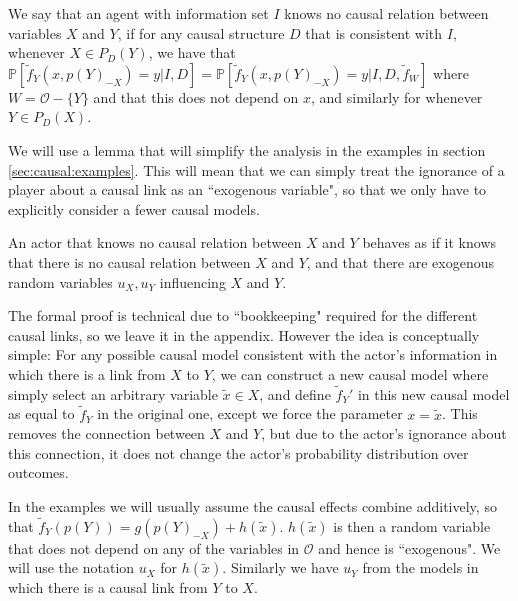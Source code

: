 \begin{definition} 
	We say that an agent with information set $I$ knows no causal relation between variables $X$ and $Y$, if for any causal structure $D$ that is consistent with $I$, whenever $X\in P_D(Y)$, we have that $\mathbb P[\tilde f_Y(x,p(Y)_{-X})=y|I,D]=\mathbb P[\tilde f_Y(x,p(Y)_{-X})=y|I,D,\tilde f_W]$ where $W=\mathcal O-\{Y\}$ and that this does not depend on $x$, and similarly for whenever $Y\in P_D(X)$.
\end{definition}


We will use a lemma that will simplify the analysis in the examples in section \ref{sec:causal:examples}. This will mean that we can simply treat the ignorance of a player about a causal link as an ``exogenous variable", so that we only have to explicitly consider a fewer causal models.

\newcommand{\noknowncauselemma}{An actor that knows no causal relation between $X$ and $Y$ behaves as if it knows that there is no causal relation between $X$ and $Y$, and that there are exogenous random variables $u_X,u_Y$ influencing $X$ and $Y$. %
}
\begin{lemma}\label{lemma:noknowncauseimpliesexogenousvariable}
	\noknowncauselemma
\end{lemma}



The formal proof is technical due to ``bookkeeping" required for the different causal links, so we leave it in the appendix. However the idea is conceptually simple: For any possible causal model consistent with the actor's information in which there is a link from $X$ to $Y$, we can construct a new causal model where simply select an arbitrary variable $\tilde x\in X$, and define $\tilde f_Y'$ in this new causal model as equal to $\tilde f_Y$ in the original one, except we force the parameter $x=\tilde x$. This removes the connection between $X$ and $Y$, but due to the actor's ignorance about this connection, it does not change the actor's probability distribution over outcomes. 
	
In the examples we will usually assume the causal effects combine additively, so that $\tilde f_Y(p(Y))=g(p(Y)_{-X})+h(\tilde x)$. $h(\tilde x)$ is then a random variable that does not depend on any of the variables in $\mathcal O$ and hence is ``exogenous". We will use the notation $u_X$ for $h(\tilde x)$. Similarly we have $u_Y$ from the models in which there is a causal link from $Y$ to $X$.



